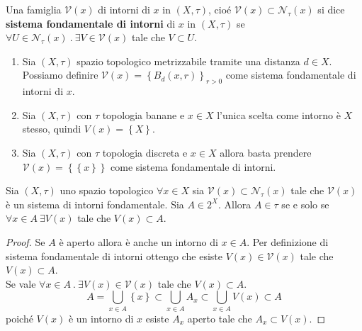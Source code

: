 \begin{definition}
	Una famiglia $\mathcal{V}(x)$ di intorni di $x$ in $(X,\tau)$, cioé $\mathcal{V}(x) \subset \mathcal{N}_\tau(x)$ si dice \textbf{sistema fondamentale di intorni} di $x$ in $(X,\tau)$ se $\forall U \in \mathcal{N}_\tau(x)\ .\ \exists V \in \mathcal{V}(x)$ tale che $V \subset U$.
\end{definition}

\begin{example}
\begin{enumerate}
	\item Sia $(X,\tau)$ spazio topologico metrizzabile tramite una distanza $d \in X$. Possiamo definire $\mathcal{V}(x) = \left\{B_d(x,r)\right\}_{r>0}$ come sistema fondamentale di intorni di $x$. 
	\item Sia $(X,\tau)$ con $\tau$ topologia banane e $x \in X$ l'unica scelta come intorno è $X$ stesso, quindi $V(x) = \left\{X\right\}$.
	\item Sia $(X,\tau)$ con $\tau$ topologia discreta e $x \in X$ allora basta prendere $\mathcal{V}(x) = \left\{\left\{x\right\}\right\}$ come sistema fondamentale di intorni.
\end{enumerate}
\end{example}

\begin{proposition}
	Sia $(X,\tau)$ uno spazio topologico $\forall x \in X$ sia $\mathcal{V}(x) \subset \mathcal{N}_\tau(x)$ tale che $\mathcal{V}(x)$ è un sistema di intorni fondamentale. Sia $A \in 2^X$. Allora $A \in \tau$ se e solo se $\forall x \in A\ \exists V(x)$ tale che $V(x) \subset A$.
\end{proposition}
\begin{proof}
	Se $A$ è aperto allora è anche un intorno di $x \in A$. Per definizione di sistema fondamentale di intorni ottengo che esiste $V(x) \in \mathcal{V}(x)$ tale che $V(x) \subset A$.\\
	
	Se vale $\forall x \in A\ .\ \exists V(x) \in \mathcal{V}(x)$ tale che $V(x) \subset A$. 
	\begin{equation*}
		A = \bigcup_{x \in A} \left\{x\right\} \subset \bigcup_{x \in A} A_x \subset \bigcup_{x \in A} V(x) \subset A
	\end{equation*}
	poiché $V(x)$ è un intorno di $x$ esiste $A_x$ aperto tale che $A_x \subset V(x)$.
\end{proof}

